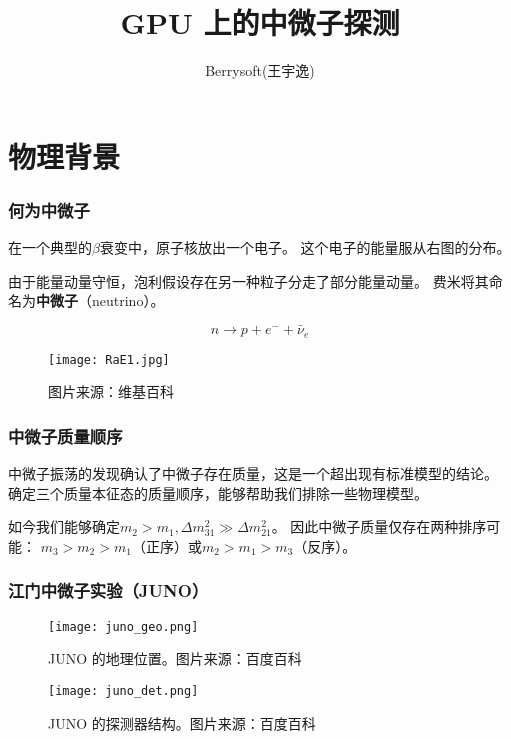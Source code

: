 \documentclass[aspectratio=169]{beamer}
\title{GPU 上的中微子探测}
\author{Berrysoft(王宇逸)}
\institute{清华大学工程物理系}
\begin{document}
\begin{frame}
    \titlepage
\end{frame}
\section{物理背景}
\begin{frame}
    \frametitle{何为中微子}

    \begin{multicols}{2}
        在一个典型的$\beta$衰变中，原子核放出一个电子。
        这个电子的能量服从右图的分布。

        由于能量动量守恒，泡利假设存在另一种粒子分走了部分能量动量。
        费米将其命名为\textbf{中微子}（neutrino）。

        \begin{equation*}
            n\to p+e^-+\bar{\nu}_e
        \end{equation*}
        \columnbreak
        \begin{figure}
            \centering
            \texttt{[image: RaE1.jpg]}
            \caption{图片来源：维基百科}
        \end{figure}
    \end{multicols}

\end{frame}

\begin{frame}
    \frametitle{中微子质量顺序}

    中微子振荡的发现确认了中微子存在质量，这是一个超出现有标准模型的结论。
    确定三个质量本征态的质量顺序，能够帮助我们排除一些物理模型。

    如今我们能够确定$m_2>m_1,\Delta m_{31}^2 \gg \Delta m_{21}^2$。
    因此中微子质量仅存在两种排序可能：
    $m_3>m_2>m_1$（正序）或$m_2>m_1>m_3$（反序）。

\end{frame}

\begin{frame}[allowframebreaks]
    \frametitle{江门中微子实验（JUNO）}

    \begin{figure}
        \centering
        \texttt{[image: juno\_geo.png]}
        \caption{JUNO 的地理位置。图片来源：百度百科}
    \end{figure}

    \begin{figure}
        \centering
        \texttt{[image: juno\_det.png]}
        \caption{JUNO 的探测器结构。图片来源：百度百科}
    \end{figure}

\end{frame}
\end{document}
